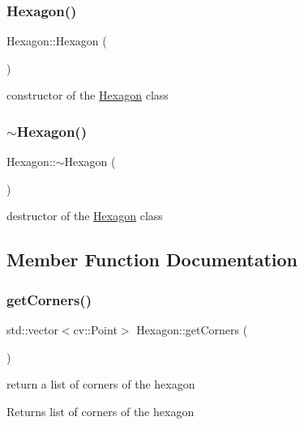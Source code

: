 \subsubsection{\texorpdfstring{Hexagon()}{Hexagon()}}
{\footnotesize\ttfamily Hexagon\+::\+Hexagon (\begin{DoxyParamCaption}{ }\end{DoxyParamCaption})}

constructor of the \mbox{\hyperlink{class_hexagon}{Hexagon}} class \mbox{\label{class_hexagon_aaaa69a37657fe47cad3c17d7c3569318}} 
\subsubsection{\texorpdfstring{$\sim$\+Hexagon()}{~Hexagon()}}
{\footnotesize\ttfamily Hexagon\+::$\sim$\+Hexagon (\begin{DoxyParamCaption}{ }\end{DoxyParamCaption})}

destructor of the \mbox{\hyperlink{class_hexagon}{Hexagon}} class 

\subsection{Member Function Documentation}
\mbox{\label{class_hexagon_aa12df068505254931530cbe74ac85ad0}} 
\subsubsection{\texorpdfstring{get\+Corners()}{getCorners()}}
{\footnotesize\ttfamily std\+::vector$<$cv\+::\+Point$>$ Hexagon\+::get\+Corners (\begin{DoxyParamCaption}{ }\end{DoxyParamCaption})}

return a list of corners of the hexagon \begin{DoxyReturn}{Returns}
list of corners of the hexagon 
\end{DoxyReturn}
\mbox{\label{class_hexagon_a1b5cdb94637901f346373429660af3b1}} 
